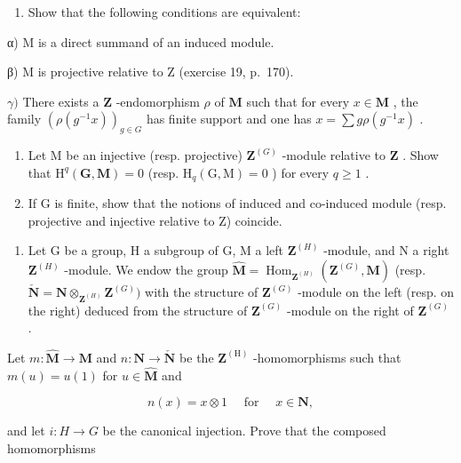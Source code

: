\begin{enumerate}
\def\labelenumi{\alph{enumi})}
\setcounter{enumi}{2}
\tightlist
\item
  Show that the following conditions are equivalent:
\end{enumerate}

α) M is a direct summand of an induced module.

β) M is projective relative to Z (exercise 19, p.~170).

\(\gamma)\) There exists a \(\mathbf{Z}\) -endomorphism \(\rho\) of \(\mathbf{M}\) such that for every \(x \in \mathbf{M}\) , the family \((\rho(g^{-1} x))_{g \in G}\) has finite support and one has \(x = \sum g\rho(g^{-1} x)\) .

\begin{enumerate}
\def\labelenumi{\alph{enumi})}
\setcounter{enumi}{3}
\item
  Let M be an injective (resp. projective) \(\mathbf{Z}^{(G)}\) -module relative to \(\mathbf{Z}\) . Show that \(\mathrm{H}^q (\mathbf{G},\mathbf{M}) = 0\) (resp. \(\mathrm{H}_q(\mathrm{G},\mathrm{M}) = 0\) ) for every \(q\geqslant 1\) .
\item
  If G is finite, show that the notions of induced and co-induced module (resp. projective and injective relative to Z) coincide.
\end{enumerate}

\begin{enumerate}
\def\labelenumi{\arabic{enumi})}
\setcounter{enumi}{12}
\tightlist
\item
  Let G be a group, H a subgroup of G, M a left \(\mathbf{Z}^{(H)}\) -module, and N a right \(\mathbf{Z}^{(H)}\) -module. We endow the group \(\hat{\mathbf{M}} = \operatorname{Hom}_{\mathbf{Z}^{(H)}} (\mathbf{Z}^{(G)}, \mathbf{M})\) (resp. \(\check{\mathbf{N}} = \mathbf{N} \otimes_{\mathbf{Z}^{(H)}} \mathbf{Z}^{(G)})\) with the structure of \(\mathbf{Z}^{(G)}\) -module on the left (resp. on the right) deduced from the structure of \(\mathbf{Z}^{(G)}\) -module on the right of \(\mathbf{Z}^{(G)}\) .
\end{enumerate}

Let \(m:\hat{\mathbf{M}}\to \mathbf{M}\) and \(n:\mathbf{N}\rightarrow \check{\mathbf{N}}\) be the \(\mathbf{Z}^{(\mathrm{H})}\) -homomorphisms such that \(m(u) = u(1)\) for \(u\in \hat{\mathbf{M}}\) and

\[
n (x) = x \otimes 1 \quad \text { for } \quad x \in \mathbf {N}  ,
\]

and let \(i: H \to G\) be the canonical injection. Prove that the composed homomorphisms

